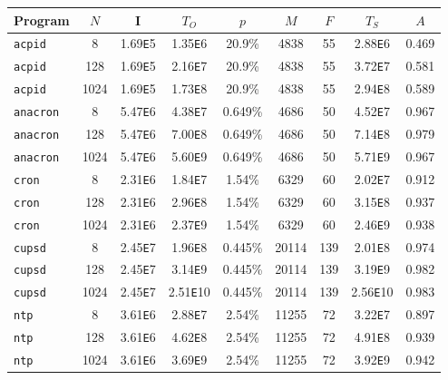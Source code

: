 \begin{table} [t]
\begin{center}
\begin{tabular}{|l||c|c||c||c|c|c||c||c|}\hline
  Program & $N$ & I & $T_O$ & $p$ & $M$ & $F$ & $T_S$ & $A$ \\\hline \hline
  \texttt{acpid} & 8 & 1.69\texttt{E}5 & 1.35\texttt{E}6 & 20.9\% & 4838 & 55 & 2.88\texttt{E}6 & 0.469 \\\hline
  \texttt{acpid} & 128 & 1.69\texttt{E}5 & 2.16\texttt{E}7 & 20.9\% & 4838 & 55 & 3.72\texttt{E}7 & 0.581 \\\hline
  \texttt{acpid} & 1024 & 1.69\texttt{E}5 & 1.73\texttt{E}8 & 20.9\% & 4838 & 55 & 2.94\texttt{E}8 & 0.589 \\\hline
  \hline

  \texttt{anacron} & 8 & 5.47\texttt{E}6 & 4.38\texttt{E}7 & 0.649\% & 4686 & 50 & 4.52\texttt{E}7 & 0.967  \\\hline
  \texttt{anacron} & 128 & 5.47\texttt{E}6 & 7.00\texttt{E}8 & 0.649\% & 4686 & 50 & 7.14\texttt{E}8 & 0.979  \\\hline
  \texttt{anacron} & 1024 & 5.47\texttt{E}6 & 5.60\texttt{E}9 & 0.649\% & 4686 & 50 & 5.71\texttt{E}9 & 0.967  \\\hline
  \hline

  \texttt{cron} & 8 & 2.31\texttt{E}6 & 1.84\texttt{E}7 & 1.54\% & 6329 & 60 & 2.02\texttt{E}7 & 0.912  \\\hline
  \texttt{cron} & 128 & 2.31\texttt{E}6 & 2.96\texttt{E}8 & 1.54\% & 6329 & 60 & 3.15\texttt{E}8 & 0.937  \\\hline
  \texttt{cron} & 1024 & 2.31\texttt{E}6 & 2.37\texttt{E}9 & 1.54\% & 6329 & 60 & 2.46\texttt{E}9 & 0.938  \\\hline
  \hline

  \texttt{cupsd} & 8 & 2.45\texttt{E}7 & 1.96\texttt{E}8 & 0.445\% & 20114 & 139 & 2.01\texttt{E}8 & 0.974  \\\hline
  \texttt{cupsd} & 128 & 2.45\texttt{E}7 & 3.14\texttt{E}9 & 0.445\% & 20114 & 139 & 3.19\texttt{E}9 & 0.982  \\\hline
  \texttt{cupsd} & 1024 & 2.45\texttt{E}7 & 2.51\texttt{E}10 & 0.445\% & 20114 & 139 & 2.56\texttt{E}10 & 0.983  \\\hline
  \hline

  \texttt{ntp} & 8 & 3.61\texttt{E}6 & 2.88\texttt{E}7 & 2.54\% & 11255 & 72 & 3.22\texttt{E}7 & 0.897  \\\hline
  \texttt{ntp} & 128 & 3.61\texttt{E}6 & 4.62\texttt{E}8 & 2.54\% & 11255 & 72 & 4.91\texttt{E}8 & 0.939  \\\hline
  \texttt{ntp} & 1024 & 3.61\texttt{E}6 & 3.69\texttt{E}9 & 2.54\% & 11255 & 72 & 3.92\texttt{E}9 & 0.942  \\\hline
  

\end{tabular}
\end{center}
\end{table}
